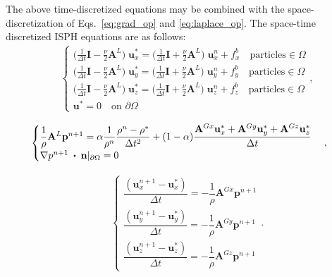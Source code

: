 The above time-discretized equations may be combined with the space-discretization of Eqs.~\ref{eq:grad_op} and \ref{eq:laplace_op}. The space-time discretized ISPH equations are as follows:
\begin{align}
&\begin{cases}\label{eq:predict_disc} 
\Big(\frac{1}{\Delta t} \mathbf{I}-\frac{\nu}{2} \mathbf{A}^L\Big)\; \mathbf{u}^*_x=
\Big(\frac{1}{\Delta t} \mathbf{I}+\frac{\nu}{2} \mathbf{A}^L\Big) \; \mathbf{u}^n_x+ {f}^b_x \quad \text{particles}\in \Omega\\
\Big(\frac{1}{\Delta t} \mathbf{I}-\frac{\nu}{2} \mathbf{A}^L\Big)\; \mathbf{u}^*_y=
\Big(\frac{1}{\Delta t} \mathbf{I}+\frac{\nu}{2} \mathbf{A}^L\Big) \; \mathbf{u}^n_y+ {f}^b_y \quad \text{particles}\in \Omega\\
\Big(\frac{1}{\Delta t} \mathbf{I}-\frac{\nu}{2} \mathbf{A}^L\Big)\; \mathbf{u}^*_z=
\Big(\frac{1}{\Delta t} \mathbf{I}+\frac{\nu}{2} \mathbf{A}^L\Big) \; \mathbf{u}^n_z+ {f}^b_z \quad \text{particles} \in \Omega\\
\mathbf{u}^*=0 \quad \text{on } \partial\Omega
\end{cases},
\end{align}

\begin{align}
&\begin{cases}\label{eq:press_disc} 
\dfrac{1}{\rho} \mathbf{A}^L \mathbf{p}^{n+1}=\alpha\dfrac{1}{\rho^n}\dfrac{\mathbf{\rho}^n-\mathbf{\rho}^*}{\Delta t^2} + (1-\alpha) \dfrac{\mathbf{A}^{Gx} \mathbf{u}_x^*+\mathbf{A}^{Gy} \mathbf{u}_y^*+\mathbf{A}^{Gz}\mathbf{u}_z^*}{\Delta t}\\
\nabla p^{n+1}\;\bigcdot\;\mathbf{n}|_{\partial \Omega}=0
\end{cases},
\end{align}

\begin{align}
&\begin{cases}\label{eq:correct_disc} 
\dfrac{(\mathbf{u}_x^{n+1}-\mathbf{u}_x^*)}{\Delta t}=-\dfrac{1}{\rho} \mathbf{A}^{Gx} \mathbf{p}^{n+1} \\
\dfrac{(\mathbf{u}_y^{n+1}-\mathbf{u}_y^*)}{\Delta t}=-\dfrac{1}{\rho} \mathbf{A}^{Gy} \mathbf{p}^{n+1}\\
\dfrac{(\mathbf{u}_z^{n+1}-\mathbf{u}_z^*)}{\Delta t}=-\dfrac{1}{\rho} \mathbf{A}^{Gz} \mathbf{p}^{n+1}
\end{cases}.
\end{align}

